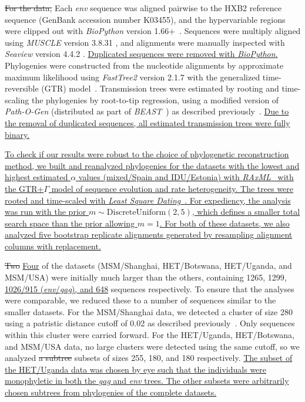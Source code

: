 \documentclass[12pt]{article}\usepackage[]{graphicx}\usepackage[]{color}
\newcommand{\add}[1]{\color{blue} \uline{#1} \color{black}}
\newcommand{\del}[1]{\color{red} \sout{#1} \color{black}}
\begin{document}
\del{For the \textcite{novitsky2014impact} data,} Each \textit{env} sequence
was aligned pairwise to the HXB2 reference sequence (GenBank accession number
K03455), and the hypervariable regions were clipped out with
\textit{BioPython} version 1.66+~\autocite{cock2009biopython}. Sequences were
multiply aligned using \textit{MUSCLE} version 3.8.31
\autocite{edgar2004muscle}, and alignments were manually inspected with
\textit{Seaview} version 4.4.2 \autocite{gouy2010seaview}. \add{Duplicated
sequences were removed with \textit{BioPython}.} Phylogenies were constructed
from the nucleotide alignments by approximate maximum likelihood using
\textit{FastTree2} version 2.1.7 \autocite{price2010fasttree} with the
generalized time-reversible (GTR) model~\autocite{tavare1986some}. Transmission
trees were estimated by rooting and time-scaling the phylogenies by root-to-tip
regression, using a modified version of \textit{Path-O-Gen} (distributed as
part of \textit{BEAST}~\autocite{drummond2007beast}) as described
previously~\autocite{poon2015phylodynamic}. \add{Due to the removal of
duplicated sequences, all estimated transmission trees were fully binary.}

\add{To check if our results were robust to the choice of phylogenetic
reconstruction method, we built and reanalyzed phylogenies for the datasets
with the lowest and highest estimated $\alpha$ values (mixed/Spain and
IDU/Estonia) with \textit{RAxML}~\autocite{stamatakis2014raxml} with the
GTR+$\Gamma$ model of sequence evolution and rate heterogeneity. The trees were
rooted and time-scaled with \textit{Least Square
Dating}~\autocite[\textit{LSD},][]{to2016fast}. For expediency, the analysis
was run with the prior $m \sim \text{DiscreteUniform}(2, 5)$, which defines a
smaller total search space than the prior allowing $m = 1$. For both of these
datasets, we also analyzed five bootstrap replicate alignments generated by
resampling alignment columns with replacement.}

\del{Two} \add{Four} of the datasets \del{\autocite{li2015hiv,novitsky2014impact}}
(MSM/Shanghai, HET/Botswana, HET/Uganda, and MSM/USA)
were initially much larger than the others, containing 1265, 1299,
\add{1026/915 (\textit{env}/\textit{gag}), and 648} sequences respectively. To
ensure that the analyses were comparable, we reduced these to a number of
sequences similar to the smaller datasets. For the MSM/Shanghai data, we
detected a cluster of size 280 using a patristic distance cutoff of 0.02 as
described previously~\autocite{poon2015impact}. Only sequences within this
cluster were carried forward. For the HET/Uganda, HET/Botswana, and MSM/USA
data, no large clusters were detected using the same cutoff, so we analyzed
\del{a subtree} subsets of sizes 255, 180, and 180 respectively. \add{The
subset of the HET/Uganda data was chosen by eye such that the individuals were
monophyletic in both the \textit{gag} and \textit{env} trees. The other
subsets were arbitrarily chosen subtrees from phylogenies of the complete
datasets.}
\end{document}
